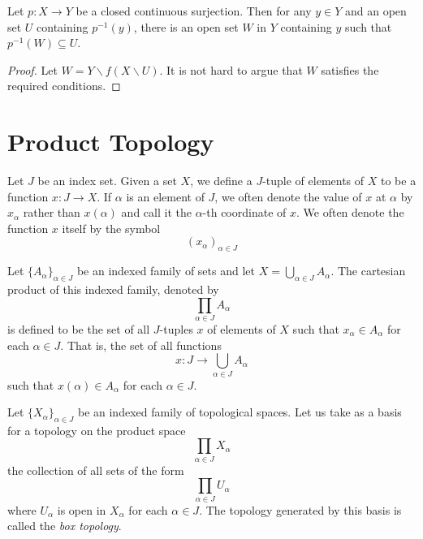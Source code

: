 \begin{lemma}
    Let $p: X\to Y$ be a closed continuous surjection. Then for any $y\in Y$ and an open set $U$ containing $p^{-1}(y)$, there is an open set $W$ in $Y$ containing $y$ such that $p^{-1}(W)\subseteq U$.
\end{lemma}
\begin{proof}
    Let $W = Y\backslash f(X\backslash U)$. It is not hard to argue that $W$ satisfies the required conditions.
\end{proof}

\section{Product Topology}
\begin{definition}
    Let $J$ be an index set. Given a set $X$, we define a $J$-tuple of elements of $X$ to be a function $x:J\to X$. If $\alpha$ is an element of $J$, we often denote the value of $x$ at $\alpha$ by $x_\alpha$ rather than $x(\alpha)$ and call it the $\alpha$-th coordinate of $x$. We often denote the function $x$ itself by the symbol
    \begin{equation*}
        (x_\alpha)_{\alpha\in J}
    \end{equation*}
\end{definition}

\begin{definition}
    Let $\{A_\alpha\}_{\alpha\in J}$ be an indexed family of sets and let $X = \bigcup_{\alpha\in J}A_\alpha$. The cartesian product of this indexed family, denoted by 
    \begin{equation*}
        \prod_{\alpha\in J}A_\alpha
    \end{equation*}
    is defined to be the set of all $J$-tuples $x$ of elements of $X$ such that $x_\alpha\in A_\alpha$ for each $\alpha\in J$. That is, the set of all functions 
    \begin{equation*}
        x: J\to\bigcup_{\alpha\in J}A_\alpha
    \end{equation*}
    such that $x(\alpha)\in A_\alpha$ for each $\alpha\in J$.
\end{definition}

\begin{definition}
    Let $\{X_\alpha\}_{\alpha\in J}$ be an indexed family of topological spaces. Let us take as a basis for a topology on the product space 
    \begin{equation*}
        \prod_{\alpha\in J}X_\alpha
    \end{equation*}
    the collection of all sets of the form 
    \begin{equation*}
        \prod_{\alpha\in J}U_\alpha
    \end{equation*}
    where $U_\alpha$ is open in $X_\alpha$ for each $\alpha\in J$. The topology generated by this basis is called the \textit{box topology}.
\end{definition}

